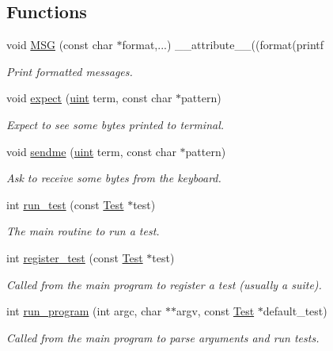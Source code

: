 \subsection*{Functions}
\begin{DoxyCompactItemize}
\item 
void \hyperlink{group__Testing_ga2e36933a48fbca44bb782f881ddceb20}{M\-S\-G} (const char $\ast$format,...) \-\_\-\-\_\-attribute\-\_\-\-\_\-((format(printf
\begin{DoxyCompactList}\small\item\em Print formatted messages. \end{DoxyCompactList}\item 
void \hyperlink{group__Testing_ga0c4e801b8c3317b802fa4e80e1e26de2}{expect} (\hyperlink{bios_8h_a91ad9478d81a7aaf2593e8d9c3d06a14}{uint} term, const char $\ast$pattern)
\begin{DoxyCompactList}\small\item\em Expect to see some bytes printed to terminal. \end{DoxyCompactList}\item 
void \hyperlink{group__Testing_ga0f97d30c4cd1370bcac6d7f4775d6789}{sendme} (\hyperlink{bios_8h_a91ad9478d81a7aaf2593e8d9c3d06a14}{uint} term, const char $\ast$pattern)
\begin{DoxyCompactList}\small\item\em Ask to receive some bytes from the keyboard. \end{DoxyCompactList}\item 
int \hyperlink{group__Testing_gac023795199b4f577a9181ac45e62b170}{run\-\_\-test} (const \hyperlink{structTest}{Test} $\ast$test)
\begin{DoxyCompactList}\small\item\em The main routine to run a test. \end{DoxyCompactList}\item 
int \hyperlink{group__Testing_ga4663cf3fb390b2a6d9cf1943f21b9934}{register\-\_\-test} (const \hyperlink{structTest}{Test} $\ast$test)
\begin{DoxyCompactList}\small\item\em Called from the main program to register a test (usually a suite). \end{DoxyCompactList}\item 
int \hyperlink{group__Testing_ga91dbdb97056588b088b689582abc2382}{run\-\_\-program} (int argc, char $\ast$$\ast$argv, const \hyperlink{structTest}{Test} $\ast$default\-\_\-test)
\begin{DoxyCompactList}\small\item\em Called from the main program to parse arguments and run tests. \end{DoxyCompactList}\end{DoxyCompactItemize}
